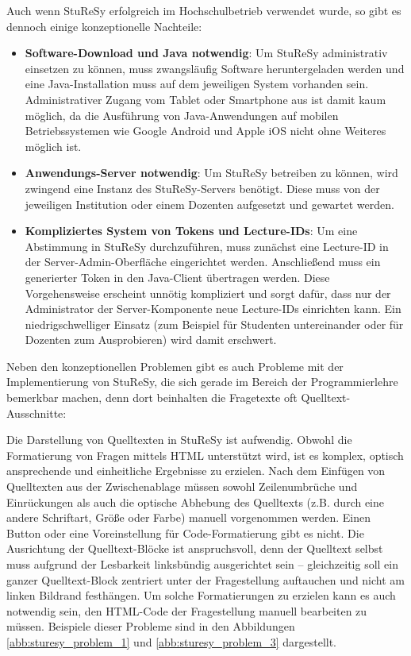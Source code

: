 Auch wenn StuReSy erfolgreich im Hochschulbetrieb verwendet wurde, so gibt es dennoch einige konzeptionelle Nachteile:
\begin{itemize}
    \item \textbf{Software-Download und Java notwendig}: Um StuReSy administrativ einsetzen zu können, muss zwangsläufig Software heruntergeladen werden und eine Java-Installation muss auf dem jeweiligen System vorhanden sein. Administrativer Zugang vom Tablet oder Smartphone aus ist damit kaum möglich, da die Ausführung von Java-Anwendungen auf mobilen Betriebssystemen wie Google Android und Apple iOS nicht ohne Weiteres möglich ist.
    \item \textbf{Anwendungs-Server notwendig}: Um StuReSy betreiben zu können, wird zwingend eine Instanz des StuReSy-Servers benötigt. Diese muss von der jeweiligen Institution oder einem Dozenten aufgesetzt und gewartet werden.
    \item \textbf{Kompliziertes System von Tokens und Lecture-IDs}: Um eine Abstimmung in StuReSy durchzuführen, muss zunächst eine Lecture-ID in der Server-Admin-Oberfläche eingerichtet werden. Anschließend muss ein generierter Token in den Java-Client übertragen werden. Diese Vorgehensweise erscheint unnötig kompliziert und sorgt dafür, dass nur der Administrator der Server-Komponente neue Lecture-IDs einrichten kann. Ein niedrigschwelliger Einsatz (zum Beispiel für Studenten untereinander oder für Dozenten zum Ausprobieren) wird damit erschwert.
\end{itemize}

Neben den konzeptionellen Problemen gibt es auch Probleme mit der Implementierung von StuReSy, die sich gerade im Bereich der Programmierlehre bemerkbar machen, denn dort beinhalten die Fragetexte oft Quelltext-Ausschnitte:

Die Darstellung von Quelltexten in StuReSy ist aufwendig. Obwohl die Formatierung von Fragen mittels HTML unterstützt wird, ist es komplex, optisch ansprechende und einheitliche Ergebnisse zu erzielen. Nach dem Einfügen von Quelltexten aus der Zwischenablage müssen sowohl Zeilenumbrüche und Einrückungen als auch die optische Abhebung des Quelltexts (z.B. durch eine andere Schriftart, Größe oder Farbe) manuell vorgenommen werden. Einen Button oder eine Voreinstellung für Code-Formatierung gibt es nicht. Die Ausrichtung der Quelltext-Blöcke ist anspruchsvoll, denn der Quelltext selbst muss aufgrund der Lesbarkeit linksbündig ausgerichtet sein – gleichzeitig soll ein ganzer Quelltext-Block zentriert unter der Fragestellung auftauchen und nicht am linken Bildrand festhängen. Um solche Formatierungen zu erzielen kann es auch notwendig sein, den HTML-Code der Fragestellung manuell bearbeiten zu müssen. Beispiele dieser Probleme sind in den Abbildungen \ref{abb:sturesy_problem_1} und \ref{abb:sturesy_problem_3} dargestellt.


